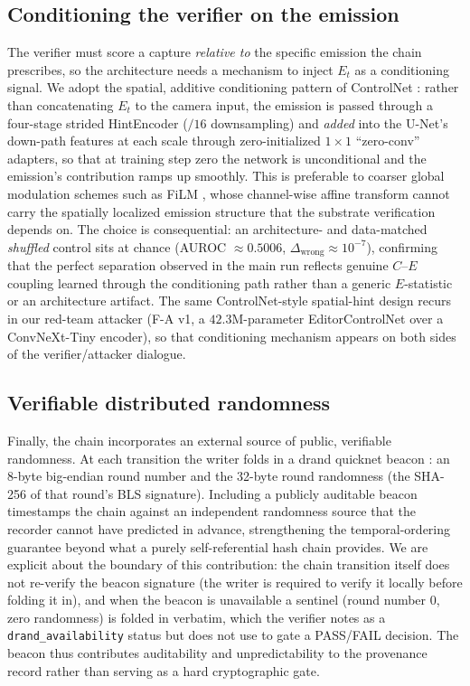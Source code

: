 \subsection{Conditioning the verifier on the emission}
The verifier must score a capture \emph{relative to} the specific emission the chain prescribes, so the architecture needs a mechanism to inject $E_t$ as a conditioning signal. We adopt the spatial, additive conditioning pattern of ControlNet \cite{zhang2023controlnet}: rather than concatenating $E_t$ to the camera input, the emission is passed through a four-stage strided HintEncoder ($/16$ downsampling) and \emph{added} into the U-Net's down-path features at each scale through zero-initialized $1\times1$ ``zero-conv'' adapters, so that at training step zero the network is unconditional and the emission's contribution ramps up smoothly. This is preferable to coarser global modulation schemes such as FiLM \cite{perez2018film}, whose channel-wise affine transform cannot carry the spatially localized emission structure that the substrate verification depends on. The choice is consequential: an architecture- and data-matched \emph{shuffled} control sits at chance (AUROC $\approx 0.5006$, $\Delta_{\text{wrong}}\approx 10^{-7}$), confirming that the perfect separation observed in the main run reflects genuine $C$--$E$ coupling learned through the conditioning path rather than a generic $E$-statistic or an architecture artifact. The same ControlNet-style spatial-hint design recurs in our red-team attacker (F-A v1, a $42.3$M-parameter EditorControlNet over a ConvNeXt-Tiny encoder), so that conditioning mechanism appears on both sides of the verifier/attacker dialogue.

\subsection{Verifiable distributed randomness}
Finally, the chain incorporates an external source of public, verifiable randomness. At each transition the writer folds in a drand quicknet beacon \cite{drandbeacon}: an 8-byte big-endian round number and the 32-byte round randomness (the SHA-256 of that round's BLS signature). Including a publicly auditable beacon timestamps the chain against an independent randomness source that the recorder cannot have predicted in advance, strengthening the temporal-ordering guarantee beyond what a purely self-referential hash chain provides. We are explicit about the boundary of this contribution: the chain transition itself does not re-verify the beacon signature (the writer is required to verify it locally before folding it in), and when the beacon is unavailable a sentinel (round number $0$, zero randomness) is folded in verbatim, which the verifier notes as a \texttt{drand\_availability} status but does not use to gate a PASS/FAIL decision. The beacon thus contributes auditability and unpredictability to the provenance record rather than serving as a hard cryptographic gate.

